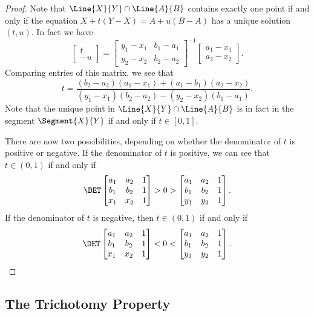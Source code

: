 \documentclass{article}
\begin{document}
\begin{itemize}
\begin{proof}
Note that $\Line{X}{Y} \cap \Line{A}{B}$ contains exactly one point if and only if the equation $X + t(Y-X) = A + u(B-A)$ has a unique solution $(t,u)$. In fact we have \[ \begin{bmatrix} t \\ -u \end{bmatrix} = \begin{bmatrix} y_1 - x_1 & b_1 - a_1 \\ y_2 - x_2 & b_2 - a_2 \end{bmatrix}^{-1} \begin{bmatrix} a_1 - x_1 \\ a_2 - x_2 \end{bmatrix}. \] Comparing entries of this matrix, we see that \[ t = \frac{(b_2-a_2)(a_1-x_1) + (a_1-b_1)(a_2-x_2)}{(y_1-x_1)(b_2-a_2) - (y_2-x_2)(b_1-a_1)}. \] Note that the unique point in $\Line{X}{Y} \cap \Line{A}{B}$ is in fact in the segment $\Segment{X}{Y}$ if and only if $t \in [0,1]$.

There are now two possibilities, depending on whether the denominator of $t$ is positive or negative. If the denominator of $t$ is positive, we can see that $t \in (0,1)$ if and only if \[ \DET \begin{bmatrix} a_1 & a_2 & 1 \\ b_1 & b_2 & 1 \\ x_1 & x_2 & 1 \end{bmatrix} > 0 > \begin{bmatrix} a_1 & a_2 & 1 \\ b_1 & b_2 & 1 \\ y_1 & y_2 & 1 \end{bmatrix}. \] If the denominator of $t$ is negative, then $t \in (0,1)$ if and only if \[ \DET \begin{bmatrix} a_1 & a_2 & 1 \\ b_1 & b_2 & 1 \\ x_1 & x_2 & 1 \end{bmatrix} < 0 < \begin{bmatrix} a_1 & a_2 & 1 \\ b_1 & b_2 & 1 \\ y_1 & y_2 & 1 \end{bmatrix}. \qedhere \]
\end{proof}
\end{itemize}



\subsection*{The Trichotomy Property}
\end{document}

